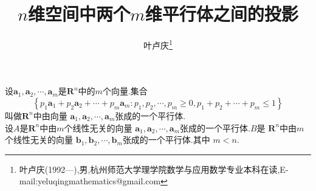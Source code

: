 \documentclass[a4paper]{article}
\begin{document}
\title{\huge{\bf{$n$维空间中两个$m$维平行体之间的投影}}} \author{\small{叶卢庆\footnote{叶卢庆(1992---),男,杭州师范大学理学院数学与应用数学专业本科在读,E-mail:yeluqingmathematics@gmail.com}}}
\maketitle
设$\mathbf{a}_1,\mathbf{a}_2,\cdots,\mathbf{a}_m$是$\mathbf{R}^n$中的$m$个向量.集合
$$\left\{p_1\mathbf{a}_1+p_2\mathbf{a}_2+\cdots+p_m\mathbf{a}_m:p_1,p_2,\cdots,p_m\geq 0,p_1+p_2+\cdots+p_m\leq
1\right\}$$叫做$\mathbf{R}^{n}$中由向量
$\mathbf{a}_1,\mathbf{a}_2,\cdots,\mathbf{a}_m$张成的一个平行体.\\

设$A$是$\mathbf{R}^{n}$中由$m$个线性无关的向量
$\mathbf{a}_1,\mathbf{a}_2,\cdots,\mathbf{a}_m$张成的一个平行体.$B$是
$\mathbf{R}^n$中由$m$个线性无关的向量
$\mathbf{b}_1,\mathbf{b}_2,\cdots,\mathbf{b}_m$张成的一个平行体.其中
$m<n$.\\
\end{document}
